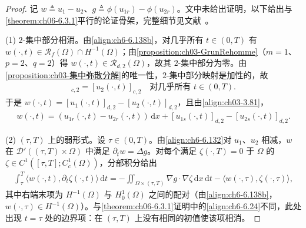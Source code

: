 \documentclass[../../main.tex]{subfiles}%
\begin{document}
\begin{proof}
记 $w\triangleq u_1-u_2$、$g\triangleq\phi(u_{1r})-\phi(u_{2r})$。文中未给出证明，以下给出与\cref{theorem:ch06-6.3.1}平行的论证骨架，完整细节见文献~\cite{ref87}。

(1) $2$-集中部分相消。由\eqref{align:ch6-6.138b}，对几乎所有 $t\in(0,T)$ 有 $w(\cdot,t)\in\mathscr{R}_f(\Omega)\cap H^{-1}(\Omega)$；由\cref{proposition:ch03-GrunRehomme}（$m=1$、$p=2$、$q=2$）得 $w(\cdot,t)\in\mathscr{R}_{d,2}(\Omega)$，故其 $2$-集中部分为零。由\cref{proposition:ch03-集中弥散分解}的唯一性，$2$-集中部分映射是加性的，故
\begin{align*}
[u_1(\cdot,t)]_{c,2}=[u_2(\cdot,t)]_{c,2}\quad\text{对几乎所有 }t\in(0,T).
\end{align*}
于是 $w(\cdot,t)=[u_1(\cdot,t)]_{d,2}-[u_2(\cdot,t)]_{d,2}$，且由\eqref{align:ch03-3.81}，
\begin{align}
w(\cdot,t)=(u_{1r}(\cdot,t)-u_{2r}(\cdot,t))\,\mathrm{d}x+[u_{1s}(\cdot,t)]_{d,2}-[u_{2s}(\cdot,t)]_{d,2}. \label{align:ch6-6.143}
\end{align}

(2) $(\tau,T)$ 上的弱形式。设 $\tau\in(0,T)$。由\eqref{align:ch6-6.132}对 $u_1$、$u_2$ 相减，$w$ 在 $\mathscr{D}'((\tau,T)\times\Omega)$ 中满足 $\partial_tw=\Delta g$。对每个满足 $\zeta(\cdot,T)=0$ 于 $\Omega$ 的 $\zeta\in C^1([\tau,T];C^1_c(\Omega))$，分部积分给出
\begin{align}
\int_\tau^T\langle w(\cdot,t),\partial_t\zeta(\cdot,t)\rangle\,\mathrm{d}t
=-\iint_{\Omega\times(\tau,T)}\nabla g\cdot\nabla\zeta\,\mathrm{d}x\,\mathrm{d}t
-\langle w(\cdot,\tau),\zeta(\cdot,\tau)\rangle , \label{align:ch6-6.144}
\end{align}
其中右端末项为 $H^{-1}(\Omega)$ 与 $H^1_0(\Omega)$ 之间的配对（由\eqref{align:ch6-6.138b}，$w(\cdot,\tau)\in H^{-1}(\Omega)$）。与\cref{theorem:ch06-6.3.1}证明中的\eqref{align:ch6-6.24}不同，此处出现 $t=\tau$ 处的边界项：在 $(\tau,T)$ 上没有相同的初值使该项相消。


\end{proof}
\end{document}

